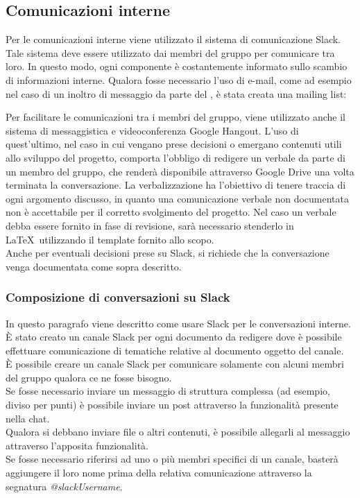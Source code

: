 \documentclass[../NormeDiProgetto.tex]{subfiles}
\begin{document}
			\subsection{Comunicazioni interne}
				Per le comunicazioni interne viene utilizzato il sistema di
				comunicazione Slack.\\
				Tale sistema deve essere utilizzato dai membri del gruppo
				per comunicare tra loro.
				In questo modo, ogni componente è costantemente informato sullo
				scambio di informazioni interne.
				Qualora fosse necessario l'uso di e-mail, come ad esempio nel caso di
				un inoltro di messaggio da parte del \responsabilediprogetto,
				è stata creata una mailing list:
				\begin{center}
					\mailinglist
				\end{center}
				Per facilitare le comunicazioni tra i membri del gruppo, viene
				utilizzato anche il sistema di messaggistica e videoconferenza
				Google Hangout.
				L'uso di quest'ultimo, nel caso in cui
				vengano prese decisioni	o emergano contenuti utili allo
				sviluppo del progetto, comporta l'obbligo di redigere un verbale
				da parte di un membro del gruppo, che renderà disponibile attraverso
				Google Drive una volta terminata la conversazione.
				La verbalizzazione ha l'obiettivo di tenere
				traccia di ogni argomento discusso, in
				quanto una comunicazione verbale non documentata non è
				accettabile per il corretto svolgimento del progetto. Nel caso un verbale
				debba essere fornito in fase di revisione, sarà necessario stenderlo in \LaTeX\
				utilizzando il template fornito allo scopo.\\
				Anche per eventuali decisioni prese su Slack, si richiede che la conversazione
				venga documentata come sopra descritto.
			
			\subsubsection{Composizione di conversazioni su Slack}
				In questo paragrafo viene descritto come usare Slack per le conversazioni interne.\\
				È stato creato un canale Slack per ogni documento da redigere dove è possibile
				effettuare comunicazione di tematiche relative al documento oggetto del canale.\\
				È possibile creare un canale Slack per comunicare solamente con alcuni membri del
				gruppo qualora ce ne fosse bisogno.\\
				Se fosse necessario inviare un messaggio di struttura complessa (ad esempio, diviso
				per punti) è possibile inviare un post attraverso la funzionalità presente nella chat.\\
				Qualora si debbano inviare file o altri contenuti, è possibile allegarli al messaggio
				attraverso l'apposita funzionalità.\\
				Se fosse necessario riferirsi ad uno o più membri specifici di un canale, basterà
				aggiungere il loro nome prima della relativa comunicazione attraverso la segnatura
				\textit{@slackUsername}.
\end{document}
